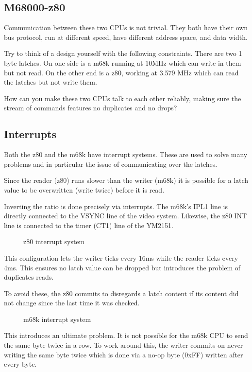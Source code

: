 \subsection{M68000-z80} Communication between these two CPUs is not trivial. They both have their own bus protocol, run at different speed, have different address space, and data width.

Try to think of a design yourself with the following constraints. There are two 1 byte latches. On one side is a m68k running at 10MHz which can write in them but not read. On the other end is a z80, working at 3.579 MHz which can read the latches but not write them. 

How can you make these two CPUs talk to each other reliably, making sure the stream of commands features no duplicates and no drops?

\subsection{Interrupts}
Both the z80 and the m68k have interrupt systems. These are used to solve many problems and in particular the issue of communicating over the latches.

Since the reader (z80) runs slower than the writer (m68k) it is possible for a latch value to be overwritten (write twice) before it is read. 

Inverting the ratio is done precisely via interrupts. The m68k's IPL1 line is directly connected to the VSYNC line of the video system. Likewise, the z80 INT line is connected to the timer (CT1) line of the YM2151.

\begin{figure}[H]
\caption*{z80 interrupt system}
\end{figure}

This configuration lets the writer ticks every 16ms while the reader ticks every 4ms. This ensures no latch value can be dropped but introduces the problem of duplicates reads.

To avoid these, the z80 commits to disregards a latch content if its content did not change since the last time it was checked.

\begin{figure}[H]
\caption*{m68k interrupt system}
\end{figure}

This introduces an ultimate problem. It is not possible for the m68k CPU to send the same byte twice in a row. To work around this, the writer commits on never writing the same byte twice which is done via a no-op byte (0xFF) written after every byte.




